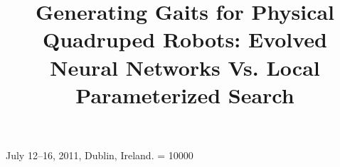 \documentclass{sig-alt-release2}
\begin{document}
 {July 12--16, 2011, Dublin, Ireland.}
\widowpenalty = 10000
%

\title{Generating Gaits for Physical Quadruped Robots: Evolved Neural Networks Vs. Local Parameterized Search}
%
%
%
%
%

%
\end{document}
